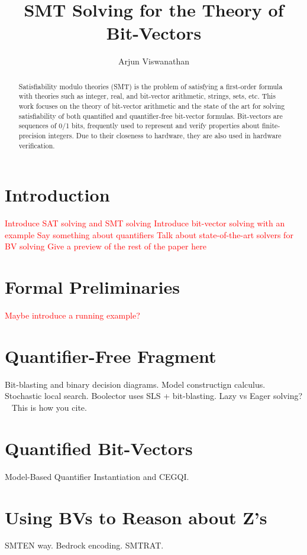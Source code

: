 \documentclass{article}
\begin{document}
\title{SMT Solving for the Theory of Bit-Vectors}
\author{Arjun Viswanathan}
\date{}
\maketitle
\begin{abstract}
	Satisfiability modulo theories (SMT) is the problem
	of satisfying a first-order formula with theories such as integer, real, and bit-vector arithmetic, strings, 
	sets, etc. This work focuses on the theory of 
	bit-vector arithmetic and the state of the art for 
	solving satisfiability of both quantified and 
	quantifier-free bit-vector formulas. Bit-vectors 
	are sequences of 0/1 bits, frequently used to 
	represent and verify properties about 
	finite-precision integers. Due to their closeness
	to hardware, they are also used in hardware
	verification.
\end{abstract}

\section{Introduction}
\label{sec:intro}
	\textcolor{red}{Introduce SAT solving and SMT solving}
	\textcolor{red}{Introduce bit-vector solving with an 
	example}
	\textcolor{red}{Say something about quantifiers}
	\textcolor{red}{Talk about state-of-the-art solvers 
	for BV solving}
	\textcolor{red}{Give a preview of the rest of the paper here}

\section{Formal Preliminaries}
\label{sec:prelim}
	\textcolor{red}{Maybe introduce a running example?}

\section{Quantifier-Free Fragment}
\label{sec:qfbv}
	Bit-blasting and binary decision diagrams. 
	Model constructign calculus. Stochastic local search.
	Boolector uses SLS + bit-blasting.
	Lazy vs Eager solving?
	~\cite{10.1007/978-3-642-22438-6_11} This is how you cite. 
	
\section{Quantified Bit-Vectors}
\label{sec:bv}
	Model-Based Quantifier Instantiation and CEGQI. 
	
\section{Using BVs to Reason about Z's}
\label{sec:bv2Z}
	SMTEN way.
	Bedrock encoding.
	SMTRAT.
	
\end{document}
